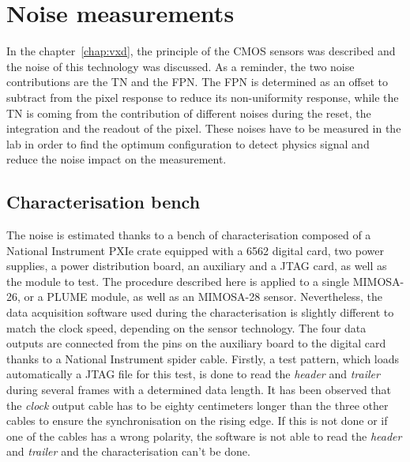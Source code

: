 \section{Noise measurements}

  In the chapter~\ref{chap:vxd}, the principle of the \gls{CMOS} sensors was described and the noise of this technology was discussed.
  As a reminder, the two noise contributions are the \acrfull{TN} and the \acrfull{FPN}.
  The \gls{FPN} is determined as an offset to subtract from the pixel response to reduce its non-uniformity response, while the \gls{TN} is coming from the contribution of different noises during the reset, the integration and the readout of the pixel.
  These noises have to be measured in the lab in order to find the optimum configuration to detect physics signal and reduce the noise impact on the measurement.

  \subsection{Characterisation bench}

  The noise is estimated thanks to a bench of characterisation composed of a National Instrument PXIe crate equipped with a 6562 digital card, two power supplies, a power distribution board, an auxiliary and a JTAG card, as well as the module to test.
  The procedure described here is applied to a single MIMOSA-26, or a PLUME module, as well as an MIMOSA-28 sensor.
  Nevertheless, the data acquisition software used during the characterisation is slightly different to match the clock speed, depending on the sensor technology.
  The four data outputs are connected from the pins on the auxiliary board to the digital card thanks to a National Instrument spider cable.
  Firstly, a test pattern, which loads automatically a JTAG file for this test, is done to read the \textit{header} and \textit{trailer} during several frames with a determined data length.
  It has been observed that the \textit{clock} output cable has to be eighty centimeters longer than the three other cables to ensure the synchronisation on the rising edge.
  If this is not done or if one of the cables has a wrong polarity, the software is not able to read the \textit{header} and \textit{trailer} and the characterisation can't be done.

